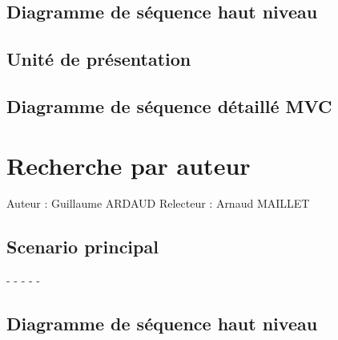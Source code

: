 \documentclass[a4paper,10pt]{report}
\begin{document}
\bigskip

\section*{Diagramme de séquence haut niveau}

\newpage

\section*{Unité de présentation}

\section*{Diagramme de séquence détaillé MVC}

\newpage


\chapter*{Recherche par auteur}

Auteur : Guillaume ARDAUD
Relecteur : Arnaud MAILLET

\bigskip
\section*{Scenario principal}
\begin{flushleft}
-
-
-
-
-
\end{flushleft}

\bigskip

\section*{Diagramme de séquence haut niveau}
\end{document}
